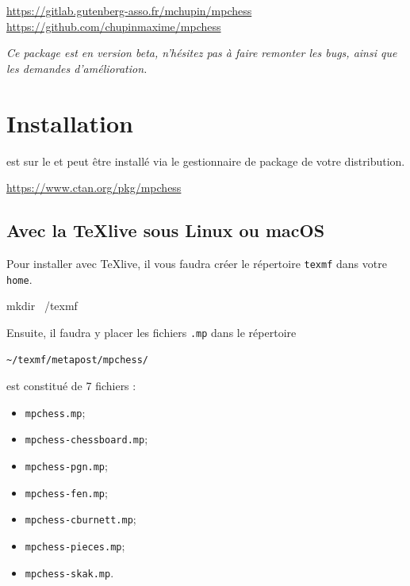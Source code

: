 \documentclass[french]{ltxdoc}
\begin{document}
\begin{center}
  \url{https://gitlab.gutenberg-asso.fr/mchupin/mpchess}
  \url{https://github.com/chupinmaxime/mpchess}
\end{center}

\tableofcontents

\bigskip

\begin{tcolorbox}[ arc=0pt,outer arc=0pt,
  colback=darkred!3,
  colframe=darkred,
  breakable,
  boxsep=0pt,left=5pt,right=5pt,top=5pt,bottom=5pt, bottomtitle =
  3pt, toptitle=3pt,
  boxrule=0pt,bottomrule=0.5pt,toprule=0.5pt, toprule at break =
  0pt, bottomrule at break = 0pt,]
  \itshape
  Ce package est en version beta, n’hésitez pas à faire remonter les bugs, ainsi
  que les demandes d’amélioration. 
\end{tcolorbox}

\section{Installation}

\mpchess est sur le \ctan{} et peut être installé via le gestionnaire de package
de votre distribution.

\begin{center}
  \url{https://www.ctan.org/pkg/mpchess}
\end{center}


\subsection{Avec la \TeX live sous Linux ou macOS}

Pour installer \mpchess avec \TeX live, il vous faudra créer le répertoire
\lstinline+texmf+ dans votre \lstinline+home+.

\begin{commandshell}
mkdir ~/texmf
\end{commandshell}

Ensuite, il faudra y placer les fichiers \lstinline+.mp+ dans le répertoire \begin{center}
  \lstinline+~/texmf/metapost/mpchess/+
\end{center}

\mpchess est constitué de 7 fichiers  :
\begin{itemize}
  \item \verb+mpchess.mp+;
  \item \verb+mpchess-chessboard.mp+;
  \item \verb+mpchess-pgn.mp+;
  \item \verb+mpchess-fen.mp+;
  \item \verb+mpchess-cburnett.mp+;
  \item \verb+mpchess-pieces.mp+;
  \item \verb+mpchess-skak.mp+.
\end{itemize}
\end{document}
